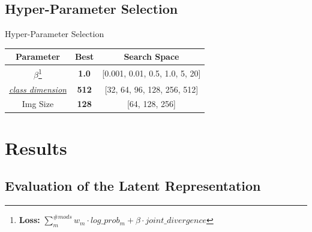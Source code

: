     \subsection{Hyper-Parameter Selection}
    \begin{frame}{Hyper-Parameter Selection}
        \begin{center}
            \begin{table}[]

                \begin{tabular}{ c c c }
                    Parameter                                         & Best         & Search Space                \\
                    \midrule
                    $\beta$\footnote{\textbf{Loss:} $\sum_m^{\#mods} w_m \cdot log\_prob_m + \beta \cdot joint\_divergence $}
                    & \textbf{1.0}
                    & [0.001, 0.01, 0.5, 1.0, 5, 20]
                    \\
                    \hyperlink{mopoe_graph}{\textit{class dimension}} & \textbf{512} & [32, 64, 96, 128, 256, 512] \\
                    Img Size                                          & \textbf{128} & [64, 128, 256]
                \end{tabular}
            \end{table}

        \end{center}

    \end{frame}


    \section{Results}

    \subsection{Evaluation of the Latent Representation}

